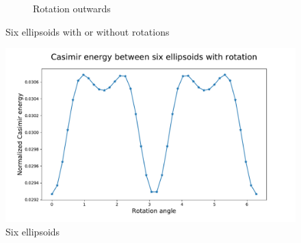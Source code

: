\begin{figure}[H]
\begin{subfigure}{.5\linewidth}
                \caption{Rotation outwards}
                \label{Rotation outwards 6}
                \end{subfigure}
                \caption{Six ellipsoids with or without rotations}
                \label{Six ellipsoids with or without rotations}
                \end{figure}
            
                \begin{figure}[H]
                    \includegraphics[scale = 0.7]{figures/CasE_6_ellip.pdf}
                    \caption{Six ellipsoids}
                    \label{Six ellipsoids}
                \end{figure}